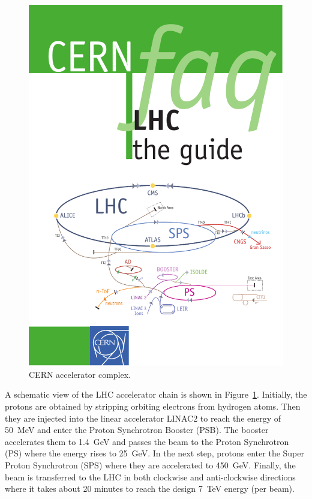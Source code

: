 \begin{figure}[!htbp]
  \centering
  \leavevmode
  \includegraphics[width=\columnwidth]{LHC}
  \caption{CERN accelerator complex.}
  \label{fig:LHC}
\end{figure}

A schematic view of the LHC accelerator chain is shown in Figure~\ref{fig:LHC}. Initially, the protons are obtained by
stripping orbiting electrons from hydrogen atoms. Then they are injected into the linear accelerator LINAC2 to reach the
energy of \SI{50}{\MeV} and enter the Proton Synchrotron Booster (PSB). The booster accelerates them to \SI{1.4}{\GeV}
and passes the beam to the Proton Synchrotron (PS) where the energy rises to \SI{25}{\GeV}. In the next step, protons
enter the Super Proton Synchrotron (SPS) where they are accelerated to \SI{450}{\GeV}. Finally, the beam is transferred
to the LHC in both clockwise and anti-clockwise directions where it takes about 20 minutes to reach the design
\SI{7}{\TeV} energy (per beam).

